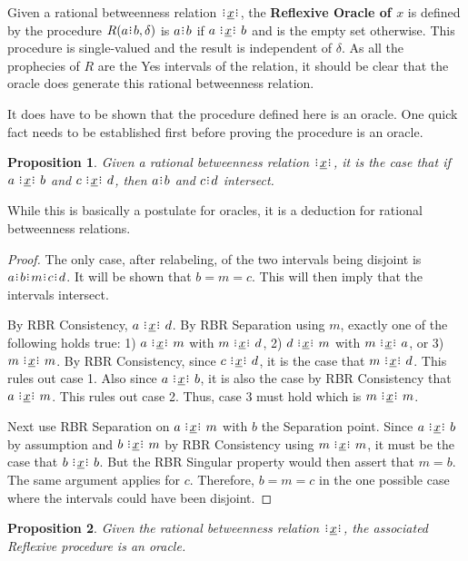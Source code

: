 \documentclass[12pt]{article}
\newtheorem{proposition}{Proposition}[section]
\begin{document}
Given a rational betweenness relation $\xrel$, the \textbf{Reflexive Oracle of $x$} is defined by the procedure $R(a\rint b, \delta)$ is $a\rint b$ if $a \xrel b$ and is the empty set otherwise. This procedure is single-valued and the result is independent of $\delta$. As all the prophecies of $R$ are the Yes intervals of the relation, it should be clear that the oracle does generate this rational betweenness relation. 

It does have to be shown that the procedure defined here is an oracle. One quick fact needs to be established first before proving the procedure is an oracle. 

\begin{proposition}
    Given a rational betweenness relation $\xrel$, it is the case that if $a \xrel b$ and $c \xrel d$, then $a\rint b$ and $c\rint d$ intersect. 
\end{proposition}

While this is basically a postulate for oracles, it is a deduction for rational betweenness relations. 

\begin{proof}
    The only case, after relabeling, of the two intervals being disjoint is $a\rint b\rint m\rint c\rint d$. It will be shown that $b = m = c$. This will then imply that the intervals intersect. 
    
    By RBR Consistency, $a \xrel d$. By RBR Separation using $m$, exactly one of the following holds true:  1) $a \xrel m$ with \sout{$m \xrel d$}, 2) $d \xrel m$ with \sout{$m \xrel a$}, or 3) $m \xrel m$. By RBR Consistency, since $c \xrel d$, it is the case that $m \xrel d$. This rules out case 1. Also since $a \xrel b$, it is also the case by RBR Consistency that $a \xrel m$. This rules out case 2. Thus, case 3 must hold which is $m \xrel m$. 
    
    Next use RBR Separation on $a \xrel m$ with $b$ the Separation point. Since $a \xrel b$ by assumption and $b \xrel m$ by RBR Consistency using $m \xrel m$, it must be the case that $b \xrel b$. But the RBR Singular property would then assert that $m = b$. The same argument applies for $c$. Therefore, $b = m = c$ in the one possible case where the intervals could have been disjoint. 
\end{proof}

\begin{proposition}
    Given the rational betweenness relation $\xrel$, the associated Reflexive procedure is an oracle. 
\end{proposition}
\end{document}
